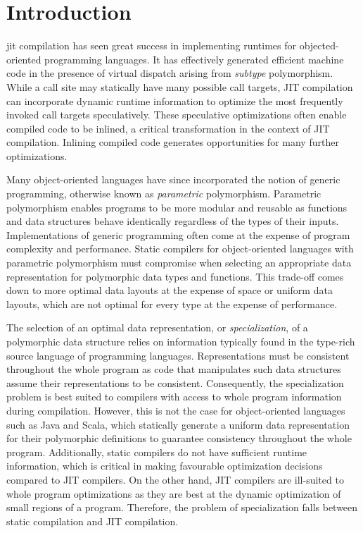 \chapter{Introduction}

\acrfull{jit} compilation has seen great success in implementing runtimes for objected-oriented programming languages.
It has effectively generated efficient machine code in the presence of virtual dispatch arising from \textit{subtype} polymorphism.
While a call site may statically have many possible call targets, JIT compilation can incorporate dynamic runtime information to optimize the most frequently invoked call targets speculatively.
These speculative optimizations often enable compiled code to be inlined, a critical transformation in the context of JIT compilation.
Inlining compiled code generates opportunities for many further optimizations.

Many object-oriented languages have since incorporated the notion of generic programming, otherwise known as \textit{parametric} polymorphism.
Parametric polymorphism enables programs to be more modular and reusable as functions and data structures behave identically\cite{tapl} regardless of the types of their inputs.
Implementations of generic programming often come at the expense of program complexity and performance.
Static compilers for object-oriented languages with parametric polymorphism must compromise when selecting an appropriate data representation for polymorphic data types and functions.
This trade-off comes down to more optimal data layouts at the expense of space or uniform data layouts, which are not optimal for every type at the expense of performance.

The selection of an optimal data representation, or \textit{specialization}, of a polymorphic data structure relies on information typically found in the type-rich source language of programming languages.
Representations must be consistent throughout the whole program as code that manipulates such data structures assume their representations to be consistent.
Consequently, the specialization problem is best suited to compilers with access to whole program information during compilation.
However, this is not the case for object-oriented languages such as Java and Scala, which statically generate a uniform data representation for their polymorphic definitions to guarantee consistency throughout the whole program. 
Additionally, static compilers do not have sufficient runtime information, which is critical in making favourable optimization decisions compared to JIT compilers.
On the other hand, JIT compilers are ill-suited to whole program optimizations as they are best at the dynamic optimization of small regions of a program.
Therefore, the problem of specialization falls between static compilation and JIT compilation.

